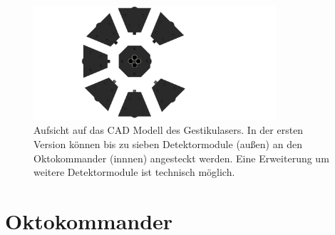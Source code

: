 \begin{figure}[h]
	\centering
	\includegraphics[width=9cm]{../CAD_Bilder/Gestikulaser_raytraced_2.png}
	\caption{Aufsicht auf das CAD Modell des Gestikulasers. In der ersten Version können bis zu sieben Detektormodule (außen) an den Oktokommander (innnen) angesteckt werden. Eine Erweiterung um weitere Detektormodule ist technisch möglich.}
	\label{fig:Gestikulaser}
\end{figure}


\section{Oktokommander}
\label{sec:Oktokommander}

